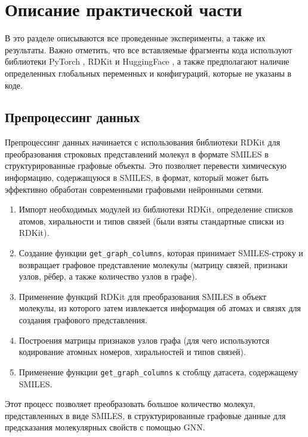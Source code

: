 \section{Описание практической части}
\label{sec:Chapter4} 

В это разделе описываются все проведенные эксперименты, а также их результаты. Важно отметить, что все вставляемые фрагменты кода используют библиотеки PyTorch \cite{pytorch}, RDKit \cite{RDKit} и HuggingFace \cite{huggingface}, а также предполагают наличие определенных глобальных переменных и конфигураций, которые не указаны в коде.


\subsection{Препроцессинг данных}
Препроцессинг данных начинается с использования библиотеки RDKit \cite{RDKit} для преобразования строковых представлений молекул в формате SMILES в структурированные графовые объекты. Это позволяет перевести химическую информацию, содержащуюся в SMILES, в формат, который может быть эффективно обработан современными графовыми нейронными сетями.

\begin{enumerate}
    \item Импорт необходимых модулей из библиотеки RDKit, определение списков атомов, хиральности и типов связей (были взяты стандартные списки из RDKit).
    
    \item Создание функции \texttt{get\_graph\_columns}, которая принимает SMILES-строку и возвращает графовое представление молекулы (матрицу связей, признаки узлов, рёбер, а также количество узлов в графе).
    
    \item Применение функций RDKit для преобразования SMILES в объект молекулы, из которого затем извлекается информация об атомах и связях для создания графового представления.
    
    \item Построения матрицы признаков узлов графа (для чего используются кодирование атомных номеров, хиральностей и типов связей).
    
    \item Применение функции \texttt{get\_graph\_columns} к стоблцу датасета, содержащему SMILES.
\end{enumerate}

Этот процесс позволяет преобразовать большое количество молекул, представленных в виде SMILES, в структурированные графовые данные для предсказания молекулярных свойств с помощью GNN. 

